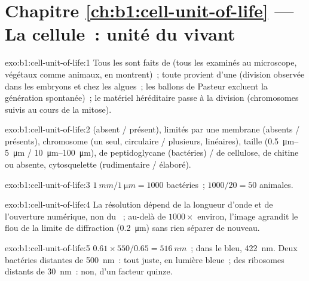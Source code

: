 \section*{Chapitre \ref{ch:b1:cell-unit-of-life} --- La cellule~: unité du vivant}

\begin{solution}{exo:b1:cell-unit-of-life:1}
Tous les  sont faits de  (tous les  examinés au
microscope, végétaux comme animaux, en montrent)~; toute  provient
d'une  (division observée dans les embryons et chez les algues~;
les ballons de Pasteur excluent la génération spontanée)~; le matériel
héréditaire passe à la division (chromosomes suivis au cours de la
mitose).
\end{solution}

\begin{solution}{exo:b1:cell-unit-of-life:2}
 (absent / présent),  limités par une membrane (absents /
présents), chromosome (un seul, circulaire / plusieurs, linéaires),
taille (\qtyrange{0.5}{5}{\micro m} / \qtyrange{10}{100}{\micro m}),
 de peptidoglycane (bactéries) / de cellulose, de chitine ou
absente, cytosquelette (rudimentaire / élaboré).
\end{solution}

\begin{solution}{exo:b1:cell-unit-of-life:3}
$\qty{1}{mm}/\qty{1}{\micro m} = 1000$ bactéries~; $1000/20 = 50$
 animales.
\end{solution}

\begin{solution}{exo:b1:cell-unit-of-life:4}
La résolution dépend de la longueur d'onde et de l'ouverture numérique,
non du ~; au-delà de $1000\times$ environ, l'image agrandit
le flou de la limite de diffraction (\qty{0.2}{\micro m}) sans rien
séparer de nouveau.
\end{solution}

\begin{solution}{exo:b1:cell-unit-of-life:5}
$0.61\times 550/0.65 = \qty{516}{nm}$~; dans le bleu, \qty{422}{nm}.
Deux bactéries distantes de \qty{500}{nm}~: tout juste, en lumière
bleue~; des ribosomes distants de \qty{30}{nm}~: non, d'un facteur
quinze.
\end{solution}

